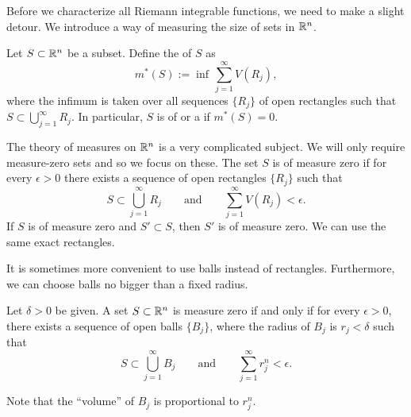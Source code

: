 Before we characterize all Riemann integrable functions, we need to make
a slight detour.  We introduce a way of measuring the size of sets in ${\mathbb{R}}^n$.

\begin{defn}
Let 
$S \subset {\mathbb{R}}^n$ be a subset.  Define the \emph{}
of $S$ as
\begin{equation*}
m^*(S)
:=
\inf\,
\sum_{j=1}^\infty V(R_j) ,
\end{equation*}
where the infimum is taken over all sequences
$\{ R_j \}$ of open rectangles such that
$S \subset \bigcup_{j=1}^\infty R_j$.
In particular, $S$ is of \emph{} or
a \emph{} if $m^*(S) = 0$.
\end{defn}

The theory of measures on ${\mathbb{R}}^n$ is a very complicated subject.
We will only require measure-zero sets and so we focus on these.
The set $S$ is of measure zero if
for every $\epsilon > 0$
there exists a sequence of open rectangles $\{ R_j \}$ such that
\begin{equation} \label{mv:eq:nullR}
S \subset \bigcup_{j=1}^\infty R_j \qquad \text{and} \qquad
\sum_{j=1}^\infty V(R_j) < \epsilon.
\end{equation}
If $S$ is of measure zero and $S' \subset S$, then
$S'$ is of measure zero.  We can use the same exact rectangles.

It is sometimes more convenient to use balls instead of rectangles.
Furthermore, we can
choose balls no bigger than a fixed radius.

\begin{prop} \label{mv:prop:ballsnull}
Let $\delta > 0$ be given.
A set $S \subset {\mathbb{R}}^n$ is measure zero if and only if for every $\epsilon >
0$, there exists a sequence of open balls $\{ B_j \}$, where the radius of
$B_j$ is $r_j < \delta$ such that
\begin{equation*}
S \subset \bigcup_{j=1}^\infty B_j \qquad \text{and} \qquad
\sum_{j=1}^\infty r_j^n < \epsilon.
\end{equation*}
\end{prop}

Note that the ``volume'' of $B_j$ is proportional to $r_j^n$.

